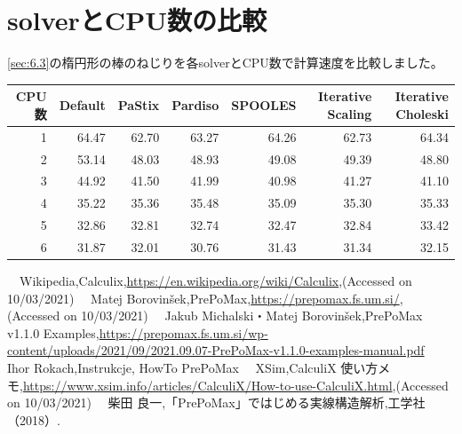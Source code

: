 \documentclass[a4j,20pt,slide]{ltjsarticle}
\begin{document}
\section{solverとCPU数の比較}
\ref{sec:6.3}の楕円形の棒のねじりを各solverとCPU数で計算速度を比較しました。
\begin{table}[H]
\centering
\begin{tabular}{@{}rrrrrrr@{}}
\toprule
CPU数 & Default & PaStix & Pardiso & SPOOLES & Iterative Scaling & Iterative Choleski \\ \midrule
1      & 64.47   & 62.70  & 63.27   & 64.26   & 62.73             & 64.34              \\
2      & 53.14   & 48.03  & 48.93   & 49.08   & 49.39             & 48.80              \\
3      & 44.92   & 41.50  & 41.99   & 40.98   & 41.27             & 41.10              \\
4      & 35.22   & 35.36  & 35.48   & 35.09   & 35.30             & 35.33              \\
5      & 32.86   & 32.81  & 32.74   & 32.47   & 32.84             & 33.42              \\
6      & 31.87   & 32.01  & 30.76   & 31.43   & 31.34             & 32.15              \\ \bottomrule
\end{tabular}
\end{table}
\begin{thebibliography}{9}
	\bibitem　Wikipedia,Calculix,\href{https://en.wikipedia.org/wiki/Calculix}{https://en.wikipedia.org/wiki/Calculix},(Accessed on 10/03/2021)
	\bibitem　Matej Borovinšek,PrePoMax,\href{https://prepomax.fs.um.si/}{https://prepomax.fs.um.si/},(Accessed on 10/03/2021)
	\bibitem　Jakub Michalski・Matej Borovinšek,PrePoMax v1.1.0 Examples,\href{https://prepomax.fs.um.si/wp-content/uploads/2021/09/2021.09.07-PrePoMax-v1.1.0-examples-manual.pdf}{https://prepomax.fs.um.si/wp-content/uploads/2021/09/2021.09.07-PrePoMax-v1.1.0-examples-manual.pdf}
	\bibitem　Ihor Rokach,Instrukcje, HowTo PrePoMax
	\bibitem　XSim,CalculiX 使い方メモ,\href{https://www.xsim.info/articles/CalculiX/How-to-use-CalculiX.html}{https://www.xsim.info/articles/CalculiX/How-to-use-CalculiX.html},(Accessed on 10/03/2021)
	\bibitem　柴田 良一,「PrePoMax」ではじめる実線構造解析,工学社（2018）.
\end{thebibliography}
\end{document}
